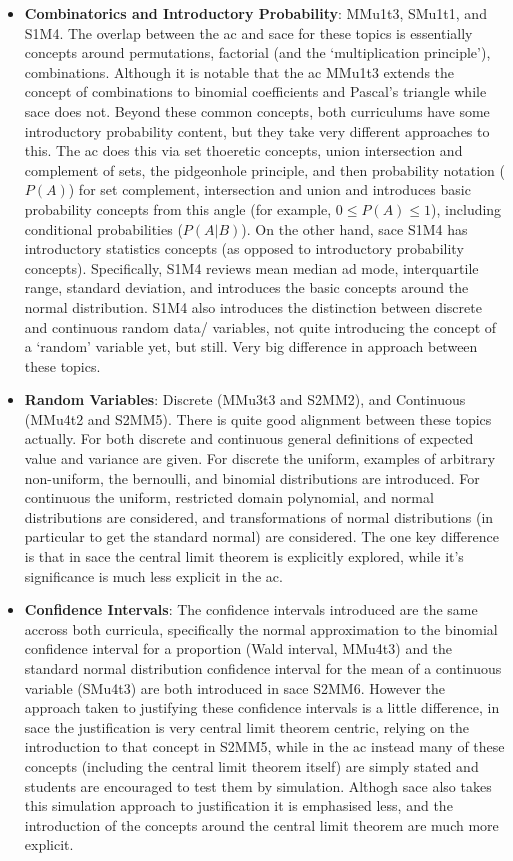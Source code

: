 \documentclass[twoside,12pt,a4paper]{report}
\begin{document}
\begin{itemize}
	\item \textbf{Combinatorics and Introductory Probability}: MMu1t3, SMu1t1, and S1M4. The overlap between the \gls{ac} and \gls{sace} for these topics is essentially concepts around permutations, factorial (and the `multiplication principle'), combinations. Although it is notable that the \gls{ac} MMu1t3 extends the concept of combinations to binomial coefficients and Pascal's triangle while \gls{sace} does not. Beyond these common concepts, both curriculums have some introductory probability content, but they take very different approaches to this. The \gls{ac} does this via set thoeretic concepts, union intersection and complement of sets, the pidgeonhole principle, and then probability notation ($P(A)$) for set complement, intersection and union and introduces basic probability concepts from this angle (for example, $0 \leq P(A) \leq 1$), including conditional probabilities ($P(A|B)$). On the other hand, \gls{sace} S1M4 has introductory statistics concepts (as opposed to introductory probability concepts). Specifically, S1M4 reviews mean median ad mode, interquartile range, standard deviation, and introduces the basic concepts around the normal distribution. S1M4 also introduces the distinction between discrete and continuous random data/ variables, not quite introducing the concept of a `random' variable yet, but still. Very big difference in approach between these topics.  
	\item \textbf{Random Variables}: Discrete (MMu3t3 and S2MM2), and Continuous (MMu4t2 and S2MM5). There is quite good alignment between these topics actually. For both discrete and continuous general definitions of expected value and variance are given. For discrete the uniform, examples of arbitrary non-uniform, the bernoulli, and binomial distributions are introduced. For continuous the uniform, restricted domain polynomial, and normal distributions are considered, and transformations of normal distributions (in particular to get the standard normal) are considered. The one key difference is that in \gls{sace} the central limit theorem is explicitly explored, while it's significance is much less explicit in the \gls{ac}.
	\item \textbf{Confidence Intervals}: The confidence intervals introduced are the same accross both curricula, specifically the normal approximation to the binomial confidence interval for a proportion (Wald interval, MMu4t3) and the standard normal distribution confidence interval for the mean of a continuous variable (SMu4t3) are both introduced in \gls{sace} S2MM6. However the approach taken to justifying these confidence intervals is a little difference, in \gls{sace} the justification is very central limit theorem centric, relying on the introduction to that concept in S2MM5, while in the \gls{ac} instead many of these concepts (including the central limit theorem itself) are simply stated and students are encouraged to test them by simulation. Althogh \gls{sace} also takes this simulation approach to justification it is emphasised less, and the introduction of the concepts around the central limit theorem are much more explicit.
\end{itemize}
\end{document}
